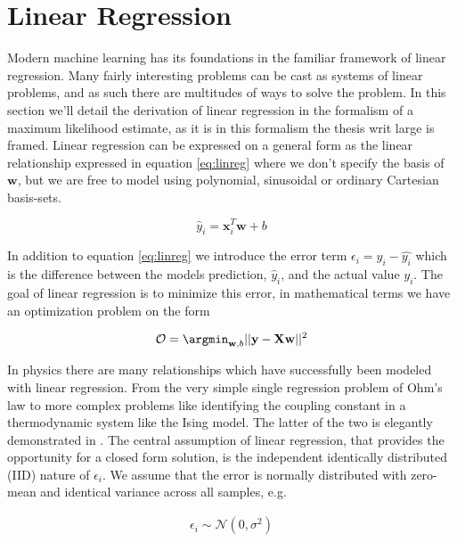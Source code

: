 
\section{Linear Regression}\label{sec:LinReg}

Modern machine learning has its foundations in the familiar framework of linear regression. Many fairly interesting problems can be cast as systems of linear problems, and as such there are multitudes of ways to solve the problem. In this section we'll detail the derivation of linear regression in the formalism of a maximum likelihood estimate, as it is in this formalism the thesis writ large is framed. Linear regression can be expressed on a general form as the linear relationship expressed in equation \ref{eq:linreg} where we don't specify the basis of $\mathbf{w}$, but we are free to model using polynomial, sinusoidal or ordinary Cartesian basis-sets.

\begin{equation}\label{eq:linreg}
\hat{y}_i = \mathbf{x}_i^T\mathbf{w} + b
\end{equation}

\noindent In addition to equation \ref{eq:linreg} we introduce the error term $\epsilon_i= y_i - \hat{y_i}$ which is the difference between the models prediction, $\hat{y}_i$, and the actual value $y_i$. The goal of linear regression is to minimize this error, in mathematical terms we have an optimization problem on the form

\begin{equation}
\mathcal{O} = \argmin _{\mathbf{w}, b} || \mathbf{y} - \mathbf{Xw} ||^2
\end{equation}

\noindent In physics there are many relationships which have successfully been modeled with linear regression. From the very simple single regression problem of Ohm's law to more complex problems like identifying the coupling constant in a thermodynamic system like the Ising model. The latter of the two is elegantly demonstrated in \citet{Mehta2019}. The central assumption of linear regression, that provides the opportunity for a closed form solution, is the independent identically distributed (IID) nature of $\epsilon_i$. We assume that the error is normally distributed with zero-mean and identical variance across all samples, e.g. 

\begin{align}
\epsilon_i \sim \mathcal{N}(0, \sigma^2)
\end{align}

